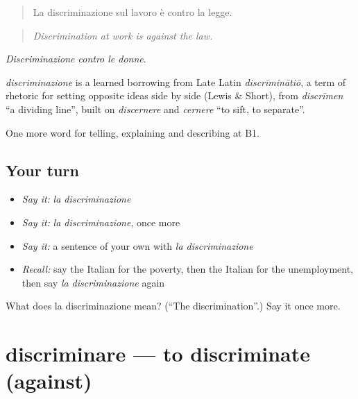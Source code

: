 \begin{quote}
La discriminazione sul lavoro è contro la legge.
\end{quote}

\begin{quote}
\emph{Discrimination at work is against the law.}
\end{quote}

\emph{Discriminazione contro le donne}.

\begin{cousinweb}
\emph{discriminazione} is a learned borrowing from Late Latin \emph{discrīminātiō}, a term of rhetoric for setting opposite ideas side by side (Lewis \& Short), from \emph{discrīmen} \textquotedblleft{}a dividing line\textquotedblright{}, built on \emph{discernere} and \emph{cernere} \textquotedblleft{}to sift, to separate\textquotedblright{}.
\end{cousinweb}

\begin{grammarlens}[title={What you've built}]
One more word for telling, explaining and describing at B1.
\end{grammarlens}

\subsection*{Your turn}
\begin{itemize}
\raggedright
  \item \emph{Say it:} \emph{la discriminazione}
  \item \emph{Say it:} \emph{la discriminazione}, once more
  \item \emph{Say it:} a sentence of your own with \emph{la discriminazione}
  \item \emph{Recall:} say the Italian for the poverty, then the Italian for the unemployment, then say \emph{la discriminazione} again
\end{itemize}

\begin{tcolorbox}[breakable,colback=teal!4,colframe=teal!35!black,title={Before you move on}]
What does la discriminazione mean? (\textquotedblleft{}The discrimination\textquotedblright{}.) Say it once more.
\end{tcolorbox}
\section[discriminare]{discriminare — to discriminate (against)}

